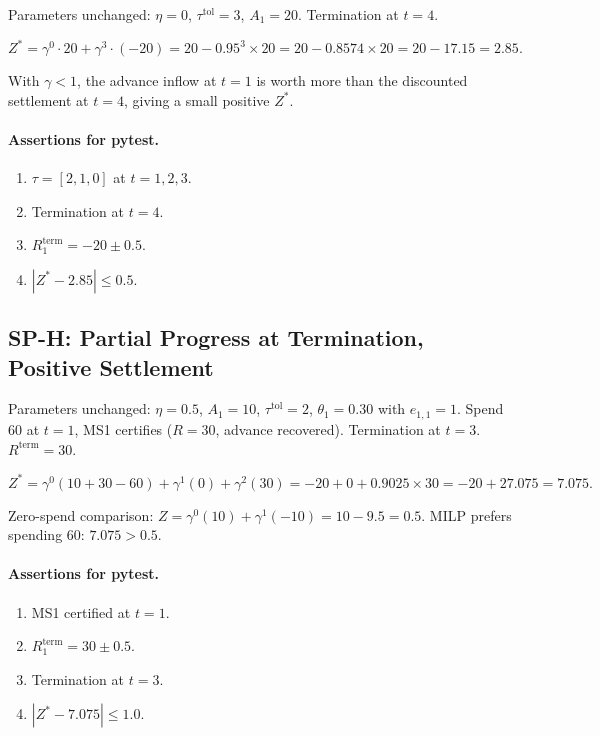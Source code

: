 \documentclass[11pt, a4paper]{article}
\begin{document}
Parameters unchanged: $\eta=0$, $\tau^{\mathrm{tol}}=3$, $A_1=20$.
Termination at $t=4$.

\[
  Z^* = \gamma^0\cdot20 + \gamma^3\cdot(-20)
      = 20 - 0.95^3\times20 = 20 - 0.8574\times20
      = 20 - 17.15 = \mathbf{2.85}.
\]

With $\gamma<1$, the advance inflow at $t=1$ is worth more than the
discounted settlement at $t=4$, giving a small positive $Z^*$.

\paragraph{Assertions for pytest.}
\begin{enumerate}[label=A\arabic*.]
  \item $\tau=[2,1,0]$ at $t=1,2,3$.
  \item Termination at $t=4$.
  \item $R_1^{\mathrm{term}}=-20\pm0.5$.
  \item $|Z^*-2.85|\leq0.5$.
\end{enumerate}

\subsection{SP-H: Partial Progress at Termination, Positive Settlement}

Parameters unchanged: $\eta=0.5$, $A_1=10$, $\tau^{\mathrm{tol}}=2$,
$\theta_1=0.30$ with $e_{1,1}=1$.
Spend 60 at $t=1$, MS1 certifies ($R=30$, advance recovered).
Termination at $t=3$. $R^{\mathrm{term}}=30$.

\[
  Z^* = \gamma^0(10+30-60) + \gamma^1(0) + \gamma^2(30)
      = -20 + 0 + 0.9025\times30
      = -20 + 27.075 = \mathbf{7.075}.
\]

Zero-spend comparison:
$Z = \gamma^0(10) + \gamma^1(-10) = 10-9.5 = 0.5$.
MILP prefers spending 60: $7.075 > 0.5$. \checkmark

\paragraph{Assertions for pytest.}
\begin{enumerate}[label=A\arabic*.]
  \item MS1 certified at $t=1$.
  \item $R_1^{\mathrm{term}}=30\pm0.5$.
  \item Termination at $t=3$.
  \item $|Z^*-7.075|\leq1.0$.
\end{enumerate}
\end{document}
